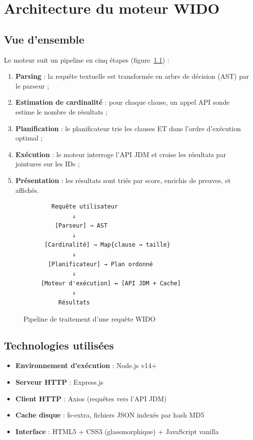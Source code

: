 \chapter{Architecture du moteur WIDO}
\label{chap:archi}

\section{Vue d'ensemble}

Le moteur \wido{} suit un pipeline en cinq étapes (figure~\ref{fig:pipeline}) :

\begin{enumerate}
    \item \textbf{Parsing} : la requête textuelle est transformée en arbre de décision (AST) par le parseur ;
    \item \textbf{Estimation de cardinalité} : pour chaque clause, un appel API sonde estime le nombre de résultats ;
    \item \textbf{Planification} : le planificateur trie les clauses ET dans l'ordre d'exécution optimal ;
    \item \textbf{Exécution} : le moteur interroge l'API JDM et croise les résultats par jointures sur les IDs ;
    \item \textbf{Présentation} : les résultats sont triés par score, enrichis de preuves, et affichés.
\end{enumerate}

\begin{figure}[H]
    \centering
    \begin{verbatim}
        Requête utilisateur
              ↓
         [Parseur] → AST
              ↓
      [Cardinalité] → Map{clause → taille}
              ↓
       [Planificateur] → Plan ordonné
              ↓
     [Moteur d'exécution] ↔ [API JDM + Cache]
              ↓
          Résultats
    \end{verbatim}
    \caption{Pipeline de traitement d'une requête WIDO}
    \label{fig:pipeline}
\end{figure}

\section{Technologies utilisées}

\begin{itemize}
    \item \textbf{Environnement d'exécution} : Node.js v14+
    \item \textbf{Serveur HTTP} : Express.js
    \item \textbf{Client HTTP} : Axios (requêtes vers l'API JDM)
    \item \textbf{Cache disque} : fs-extra, fichiers JSON indexés par hash MD5
    \item \textbf{Interface} : HTML5 + CSS3 (glassmorphique) + JavaScript vanilla
\end{itemize}

